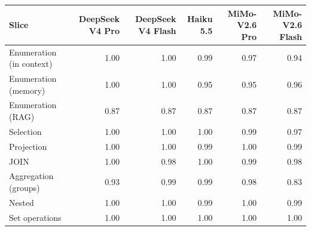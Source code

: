 \begin{tabular}{lrrrrr}
\toprule
Slice & DeepSeek V4 Pro & DeepSeek V4 Flash & Haiku 5.5 & MiMo-V2.6 Pro & MiMo-V2.6 Flash \\
\midrule
Enumeration (in context) & 1.00 & 1.00 & 0.99 & 0.97 & 0.94 \\
Enumeration (memory) & 1.00 & 1.00 & 0.95 & 0.95 & 0.96 \\
Enumeration (RAG) & 0.87 & 0.87 & 0.87 & 0.87 & 0.87 \\
Selection & 1.00 & 1.00 & 1.00 & 0.99 & 0.97 \\
Projection & 1.00 & 1.00 & 0.99 & 1.00 & 0.99 \\
JOIN & 1.00 & 0.98 & 1.00 & 0.99 & 0.98 \\
Aggregation (groups) & 0.93 & 0.99 & 0.99 & 0.98 & 0.83 \\
Nested & 1.00 & 1.00 & 0.99 & 1.00 & 0.99 \\
Set operations & 1.00 & 1.00 & 1.00 & 1.00 & 1.00 \\
\bottomrule
\end{tabular}
